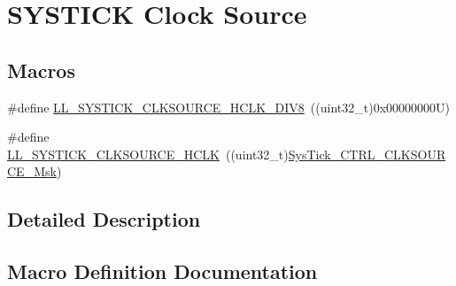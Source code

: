 \hypertarget{group___c_o_r_t_e_x___l_l___e_c___c_l_k_s_o_u_r_c_e___h_c_l_k}{}\section{S\+Y\+S\+T\+I\+CK Clock Source}
\label{group___c_o_r_t_e_x___l_l___e_c___c_l_k_s_o_u_r_c_e___h_c_l_k}
\subsection*{Macros}
\begin{DoxyCompactItemize}
\item 
\#define \hyperlink{group___c_o_r_t_e_x___l_l___e_c___c_l_k_s_o_u_r_c_e___h_c_l_k_gab13c4588c1b1a8b867541a4ad928d205}{L\+L\+\_\+\+S\+Y\+S\+T\+I\+C\+K\+\_\+\+C\+L\+K\+S\+O\+U\+R\+C\+E\+\_\+\+H\+C\+L\+K\+\_\+\+D\+I\+V8}~((uint32\+\_\+t)0x00000000\+U)
\item 
\#define \hyperlink{group___c_o_r_t_e_x___l_l___e_c___c_l_k_s_o_u_r_c_e___h_c_l_k_gaa92530d2f2cd8ce785297e4aed960ff0}{L\+L\+\_\+\+S\+Y\+S\+T\+I\+C\+K\+\_\+\+C\+L\+K\+S\+O\+U\+R\+C\+E\+\_\+\+H\+C\+LK}~((uint32\+\_\+t)\hyperlink{group___c_m_s_i_s___sys_tick_gaa41d06039797423a46596bd313d57373}{Sys\+Tick\+\_\+\+C\+T\+R\+L\+\_\+\+C\+L\+K\+S\+O\+U\+R\+C\+E\+\_\+\+Msk})
\end{DoxyCompactItemize}


\subsection{Detailed Description}


\subsection{Macro Definition Documentation}
\mbox{\label{group___c_o_r_t_e_x___l_l___e_c___c_l_k_s_o_u_r_c_e___h_c_l_k_gaa92530d2f2cd8ce785297e4aed960ff0}} 
